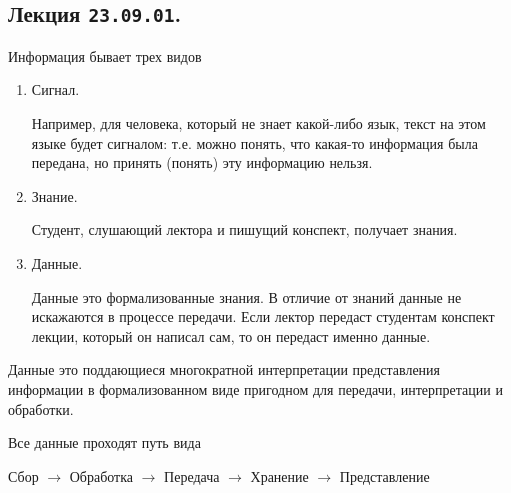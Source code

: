 \subsection{%
  Лекция \texttt{23.09.01}.%
}

Информация бывает трех видов

\begin{enumerate}
\item
  Сигнал.

  Например, для человека, который не знает какой-либо язык, текст на этом языке
  будет сигналом: т.е. можно понять, что какая-то информация была передана, но
  принять (понять) эту информацию нельзя.

\item
  Знание.

  Студент, слушающий лектора и пишущий конспект, получает знания.

\item
  Данные.

  Данные это формализованные знания. В отличие от знаний данные не искажаются в
  процессе передачи. Если лектор передаст студентам конспект лекции, который он
  написал сам, то он передаст именно данные.
\end{enumerate}

\begin{definition}
  Данные это поддающиеся многократной интерпретации представления информации в
  формализованном виде пригодном для передачи, интерпретации и обработки.
\end{definition}

Все данные проходят путь вида

\begin{center}
  Сбор \(\to\)
  Обработка \(\to\)
  Передача \(\to\)
  Хранение \(\to\)
  Представление
\end{center}

